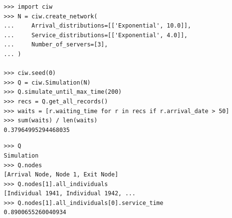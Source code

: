 \documentclass[usenames,dvipsnames,t]{beamer}
\begin{document}
\begin{columns}
\begin{column}{0.5\textwidth}
\end{column}

\begin{column}{0.5\textwidth}
  \begin{center}
  \begin{minipage}[c]{0.9\textwidth}
    \begin{tcolorbox}[colback=ciwyellow!15,colframe=ciwyellow, title=\small{READABLE}, coltitle=white, halign title=right]
      \begin{center}
        \small{
          \begin{verbatim}
>>> import ciw
>>> N = ciw.create_network(
...     Arrival_distributions=[['Exponential', 10.0]],
...     Service_distributions=[['Exponential', 4.0]],
...     Number_of_servers=[3],
... )

>>> ciw.seed(0)
>>> Q = ciw.Simulation(N)
>>> Q.simulate_until_max_time(200)
>>> recs = Q.get_all_records()
>>> waits = [r.waiting_time for r in recs if r.arrival_date > 50]
>>> sum(waits) / len(waits)
0.37964995294468035
          \end{verbatim}
        }
      \end{center}
    \end{tcolorbox}
    \vspace{10mm}
    \begin{tcolorbox}[colback=mplblue!15,colframe=mplblue, title=\small{MODULAR}, coltitle=white, halign title=right]
          \begin{center}
            
          \end{center}
          \small{
            \begin{verbatim}
>>> Q
Simulation
>>> Q.nodes
[Arrival Node, Node 1, Exit Node]
>>> Q.nodes[1].all_individuals
[Individual 1941, Individual 1942, ...
>>> Q.nodes[1].all_individuals[0].service_time
0.8900655260040934
            \end{verbatim}
          }
    \end{tcolorbox}
    \vspace{10mm}
    \begin{tcolorbox}[colback=textorange!15,colframe=textorange, title=\small{EXTENDIBLE}, coltitle=white, halign title=right]
    \begin{columns}
    \hspace{0.02\textwidth}
    \begin{column}{0.32\textwidth}
      \begin{center}

\end{center}
\end{column}
\end{columns}
\end{tcolorbox}
\end{minipage}
\end{center}
\end{column}
\end{columns}
\end{document}
